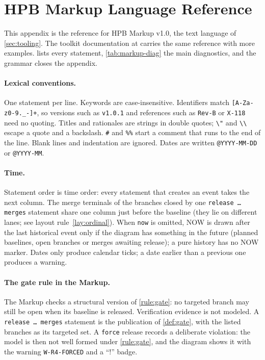 \section{HPB Markup Language Reference}
\label{app:markup}

This appendix is the reference for HPB Markup v1.0, the text language of
\cref{sec:tooling}. The toolkit documentation at \hpbrepo{} carries the
same reference with more examples.  lists every
statement, \cref{tab:markup-diag} the main diagnostics, and the grammar
closes the appendix.

\paragraph{Lexical conventions.}
One statement per line. Keywords are case-insensitive. Identifiers match
\texttt{[A-Za-z0-9.\_-]+}, so versions such as \texttt{v1.0.1} and
references such as \texttt{Rev-B} or \texttt{X-118} need no quoting. Titles
and rationales are strings in double quotes; \texttt{\textbackslash"} and
\texttt{\textbackslash\textbackslash} escape a quote and a backslash.
\texttt{\#} and \texttt{\%\%} start a comment that runs to the end of the
line. Blank lines and indentation are ignored. Dates are written
\texttt{@YYYY-MM-DD} or \texttt{@YYYY-MM}.

\paragraph{Time.}
Statement order is time order: every statement that creates an event takes
the next column. The merge terminals of the branches closed by one
\texttt{release \dots{} merges} statement share one column just before the
baseline (they lie on different lanes; see layout rule~\ref{lay:ordinal}).
When \texttt{now} is omitted, NOW is drawn after the last historical event
only if the diagram has something in the future (planned baselines, open
branches or merges awaiting release); a pure history has no NOW marker.
Dates only produce calendar ticks; a date earlier than a previous one
produces a warning.

\paragraph{The gate rule in the Markup.}
The Markup checks a structural version of \cref{rule:gate}: no targeted
branch may still be open when its baseline is released. Verification
evidence is not modeled. A \texttt{release \dots{} merges} statement is the
publication of \cref{def:gate}, with the listed branches as its targeted
set. A \texttt{force} release records a deliberate violation: the model is
then not well formed under \cref{rule:gate}, and the diagram shows it with
the warning \texttt{W-R4-FORCED} and a ``!'' badge.

